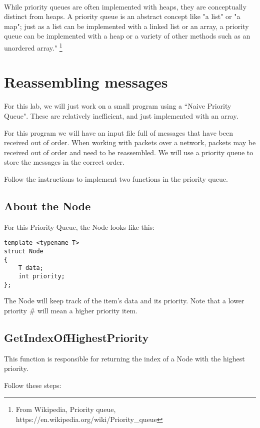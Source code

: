 \documentclass[a4paper,12pt,oneside]{book}
\begin{document}
        ~\\
        While priority queues are often implemented with heaps, they are conceptually distinct from heaps. A priority queue is an abstract concept like "a list" or "a map"; just as a list can be implemented with a linked list or an array, a priority queue can be implemented with a heap or a variety of other methods such as an unordered array."
        \footnote{From Wikipedia, Priority queue, https://en.wikipedia.org/wiki/Priority\_queue}

    \newpage
    \section{Reassembling messages}

    For this lab, we will just work on a small program using a ``Naive Priority Queue".
    These are relatively inefficient, and just implemented with an array.
    
    For this program we will have an input file full of messages that have
    been received out of order. When working with packets over a network,
    packets may be received out of order and need to be reassembled.
    We will use a priority queue to store the messages in the correct order.

    Follow the instructions to implement two functions in the priority queue.

    \subsection{About the Node}

    For this Priority Queue, the Node looks like this:

\begin{lstlisting}[style=code]
template <typename T>
struct Node
{
    T data;
    int priority;
};    
\end{lstlisting}

    The Node will keep track of the item's data and its priority.
    Note that a lower priority \# will mean a higher priority item.


    \subsection{GetIndexOfHighestPriority}

    This function is responsible for returning the index of a Node with the highest priority.

    Follow these steps:
\end{document}
